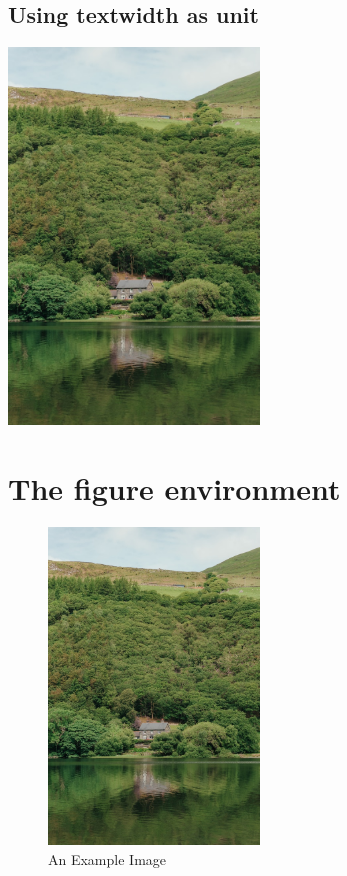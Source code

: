 \documentclass{article}
\begin{document}
\subsection{Using textwidth as unit}
  \includegraphics[width=0.5\textwidth]{shawnanggg-SQ9Q1nvwhlI-unsplash.jpg}

\section{The figure environment}
\begin{figure}[h]
\caption{An Example Image}
\includegraphics[width=0.5\textwidth]{shawnanggg-SQ9Q1nvwhlI-unsplash.jpg}
\end{figure}
\end{document}
